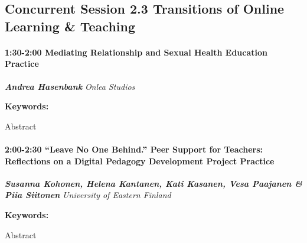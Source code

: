 \documentclass[
]{book}
\begin{document}
\hypertarget{concurrent-session-2.3-transitions-of-online-learning-teaching}{%
\subsection*{Concurrent Session 2.3 \textbar{} Transitions of Online Learning \& Teaching}\label{concurrent-session-2.3-transitions-of-online-learning-teaching}}

\begin{session}
\hypertarget{mediating-relationship-and-sexual-health-education-practice}{%
\paragraph*{\texorpdfstring{1:30-2:00 \textbar{} \textbf{Mediating
Relationship and Sexual Health Education} \textbar{}
Practice}{1:30-2:00 \textbar{} Mediating Relationship and Sexual Health Education \textbar{} Practice}}\label{mediating-relationship-and-sexual-health-education-practice}}

\textbf{\emph{Andrea Hasenbank}} \textbar{} \emph{Onlea Studios}

\textbf{Keywords:}

Abstract
\end{session}

\begin{session}
\hypertarget{leave-no-one-behind.-peer-support-for-teachers-reflections-on-a-digital-pedagogy-development-project-practice}{%
\paragraph*{\texorpdfstring{2:00-2:30 \textbar{} \textbf{``Leave No One
Behind.'' Peer Support for Teachers: Reflections on a Digital Pedagogy
Development Project} \textbar{}
Practice}{2:00-2:30 \textbar{} ``Leave No One Behind.'' Peer Support for Teachers: Reflections on a Digital Pedagogy Development Project \textbar{} Practice}}\label{leave-no-one-behind.-peer-support-for-teachers-reflections-on-a-digital-pedagogy-development-project-practice}}

\textbf{\emph{Susanna Kohonen, Helena Kantanen, Kati Kasanen, Vesa
Paajanen \& Piia Siitonen}} \textbar{} \emph{University of Eastern
Finland}

\textbf{Keywords:}

Abstract
\end{session}
\end{document}

